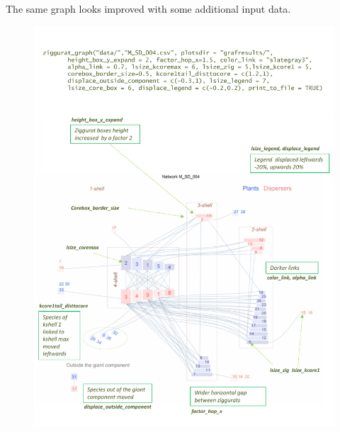 \documentclass[11pt]{article}
\begin{document}
The same graph looks improved with some additional input data.
\clearpage
\begin{figure}[hbt!]
\centering
\includegraphics[scale=0.75]{M_SD_004_ziggurat_improved.pdf}
\label{fig:KMAN_ziggurat}
\end{figure}
\end{document}

